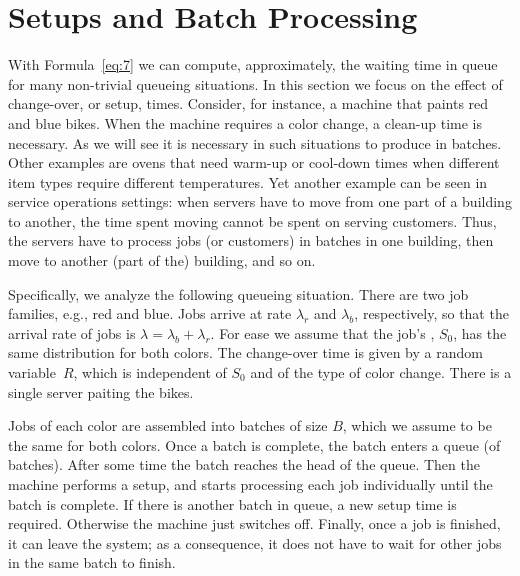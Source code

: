 \section{Setups and Batch Processing}
\label{sec:setups-batch-proc}



With Formula~\cref{eq:7} we can compute, approximately, the waiting time in queue for many non-trivial queueing situations.
In this section we focus on the effect of change-over, or setup, times.
Consider, for instance, a machine that paints red and blue bikes.
When the machine requires a color change, a clean-up time is necessary.
As we will see it is necessary in such situations to produce in batches.
Other examples are ovens that need warm-up or cool-down times when different item types require different temperatures.
Yet another example can be seen in service operations settings: when servers have to move from one part of a building to another, the time spent moving cannot be spent on serving customers.
Thus, the servers have to process jobs (or customers) in batches in one building, then move to another (part of the) building, and so on.

Specifically, we analyze the following queueing situation.
There are two job families, e.g., red and blue.
Jobs arrive at rate $\lambda_r$ and $\lambda_b$, respectively, so that the arrival rate of jobs is $\lambda= \lambda_b+\lambda_r$.
For ease we assume that the job's , $S_0$, has the same distribution for both colors.
The change-over time is given by a random variable~$R$, which is independent of $S_0$ and of the type of color change.
There is a single server paiting the bikes.

Jobs of each color are assembled into batches of size $B$, which we assume to be the same for both colors.
Once a batch is complete, the batch enters a queue (of batches).
After some time the batch reaches the head of the queue.
Then the machine performs a setup, and starts processing each job individually until the batch is complete.
If there is another batch in queue, a new setup time is required.
Otherwise the machine just switches off.
Finally, once a job is finished, it can leave the system; as a consequence, it does not have to wait for other jobs in the same batch to finish.

